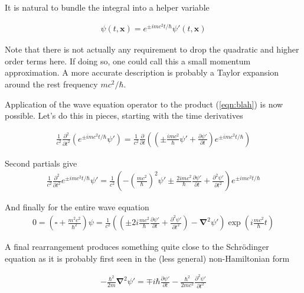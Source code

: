 \documentclass[]{eliblog}
\newcommand{\Bx}[0]{\mathbf{x}}
\newcommand{\spacegrad}[0]{\boldsymbol{\nabla}}
\newcommand{\delambertian}[0]{\square}
\newcommand{\inv}[1]{\frac{1}{#1}}
\begin{document}
It is natural to bundle the integral into a helper variable

\begin{align}\label{eqn:blah}
{\psi}(t,\Bx) = e^{\pm im c^2 t /\hbar} \psi'(t,\Bx)
\end{align}

Note that there is not actually any requirement to drop the quadratic and higher order terms here.  If doing so, one could 
call this a small momentum approximation.  A more accurate description is probably a Taylor expansion around the rest frequency $m c^2/\hbar$.

Application of the wave equation operator to the product (\ref{eqn:blah}) is now possible.  Let's do this in pieces, starting with the 
time derivatives

\begin{align}
\inv{c^2}\frac{\partial^2}{\partial t^2} \left( e^{\pm im c^2 t /\hbar} \psi' \right)
=
\inv{c^2}\frac{\partial}{\partial t} 
\left( \left( \pm \frac{i m c^2}{\hbar} \psi' + \frac{\partial \psi'}{\partial t} \right) e^{\pm im c^2 t /\hbar} \right)
\end{align}

Second partials give
\begin{align}
\inv{c^2}\frac{\partial^2}{\partial t^2} e^{\pm im c^2 t /\hbar} \psi'
=
\inv{c^2}
\left( - \left(\frac{m c^2}{\hbar}\right)^2 \psi' \pm \frac{2 i m c^2}{\hbar} \frac{\partial \psi'}{\partial t} + \frac{\partial^2 \psi'}{\partial t^2} \right) e^{\pm im c^2 t /\hbar} 
\end{align}

And finally for the entire wave equation
\begin{align}
0 = \left( \delambertian + \frac{m^2 c^2}{\hbar^2} \right) \psi
=
\frac{1}{c^2}
\left(
\left( 
\pm 2 i \frac{m c^2}{\hbar} \frac{\partial \psi'}{\partial t} +
\frac{\partial^2 \psi'}{\partial t^2}
\right)
-
\spacegrad^2 \psi'
\right)
\exp\left( i \frac{m c^2}{\hbar} t \right)
\end{align}

A final rearrangement produces something quite close to the Schr\"{o}dinger equation as it is probably first seen in the (less general) non-Hamiltonian form

\begin{align}
-\frac{\hbar^2}{2m} \spacegrad^2 \psi' = \mp i \hbar \frac{\partial \psi'}{\partial t} -\frac{\hbar^2}{2m c^2} \frac{\partial^2 \psi'}{\partial t^2}
\end{align}
\end{document}
